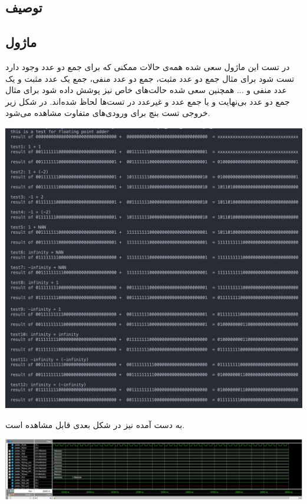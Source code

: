 \documentclass[12pt,titlepage,a4page , tikz , multi,table , svgnames,xcdraw]{article}
\begin{document}
\subsection{توصیف  }
\subsection{ ماژول }
در تست این ماژول سعی شده همه‌ی حالات ممکنی که برای جمع دو عدد وجود دارد تست شود برای مثال جمع دو عدد مثبت، جمع دو عدد منفی، جمع یک عدد مثبت و یک عدد منفی و ... همچنین سعی شده حالت‌های خاص نیز پوشش داده شود برای مثال جمع دو عدد بی‌نهایت و یا جمع عدد و غیرعدد در تست‌ها لحاظ شده‌اند.
در شکل زیر خروجی تست بنچ برای ورودی‌های متفاوت مشاهده می‌شود.
\begin{center}
\includegraphics[scale=0.2]
    {Images/Test Bench/adder_test_bench.png}
\end{center}
 به دست آمده نیز در شکل بعدی قابل مشاهده است.
\begin{center}
\includegraphics[scale=0.45]
    {Images/Test Bench/adder_waveform.jpg}
\end{center}
\end{document}
